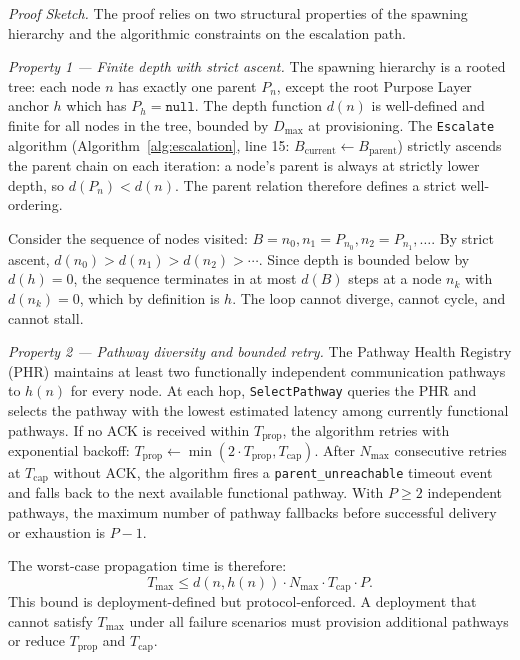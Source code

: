 \bigskip
\noindent\textit{Proof Sketch.} The proof relies on two structural properties of the \bxthree{} spawning hierarchy and the algorithmic constraints on the escalation path.

\medskip
\noindent\textit{Property 1 — Finite depth with strict ascent.} The \bxthree{} spawning hierarchy is a rooted tree: each node $n$ has exactly one parent $P_n$, except the root Purpose Layer anchor $h$ which has $P_h = \texttt{null}$. The depth function $d(n)$ is well-defined and finite for all nodes in the tree, bounded by $D_{\max}$ at provisioning. The \texttt{Escalate} algorithm (Algorithm~\ref{alg:escalation}, line 15: $B_{\text{current}} \leftarrow B_{\text{parent}}$) strictly ascends the parent chain on each iteration: a node's parent is always at strictly lower depth, so $d(P_n) < d(n)$. The parent relation therefore defines a strict well-ordering.

Consider the sequence of nodes visited: $B = n_0, n_1 = P_{n_0}, n_2 = P_{n_1}, \ldots$. By strict ascent, $d(n_0) > d(n_1) > d(n_2) > \cdots$. Since depth is bounded below by $d(h) = 0$, the sequence terminates in at most $d(B)$ steps at a node $n_k$ with $d(n_k) = 0$, which by definition is $h$. The loop cannot diverge, cannot cycle, and cannot stall.

\medskip
\noindent\textit{Property 2 — Pathway diversity and bounded retry.} The Pathway Health Registry (PHR) maintains at least two functionally independent communication pathways to $h(n)$ for every node. At each hop, \texttt{SelectPathway} queries the PHR and selects the pathway with the lowest estimated latency among currently functional pathways. If no ACK is received within $T_{\text{prop}}$, the algorithm retries with exponential backoff: $T_{\text{prop}} \leftarrow \min(2 \cdot T_{\text{prop}}, T_{\text{cap}})$. After $N_{\max}$ consecutive retries at $T_{\text{cap}}$ without ACK, the algorithm fires a \texttt{parent\_unreachable} timeout event and falls back to the next available functional pathway. With $P \geq 2$ independent pathways, the maximum number of pathway fallbacks before successful delivery or exhaustion is $P - 1$.

The worst-case propagation time is therefore:
\begin{equation}
T_{\max} \leq d(n, h(n)) \cdot N_{\max} \cdot T_{\text{cap}} \cdot P. \tag{LT}
\end{equation}
This bound is deployment-defined but protocol-enforced. A deployment that cannot satisfy $T_{\max}$ under all failure scenarios must provision additional pathways or reduce $T_{\text{prop}}$ and $T_{\text{cap}}$.

